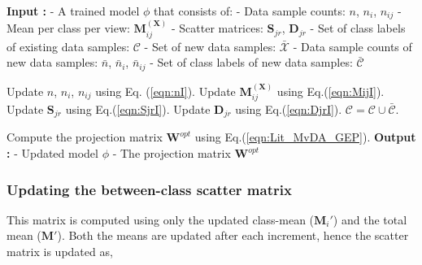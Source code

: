 \begin{algorithm}[t]
\caption{2DMvIDDA: Incremental algorithm}
    \begin{algorithmic}
	\STATE \textbf{Input :}
	\STATE - A trained model $\phi$ that consists of:
	\STATE 		\hspace{0.3cm} - Data sample counts: $n$, $n_i$, $n_{ij}$
	\STATE 		\hspace{0.3cm} - Mean per class per view: $\textbf{M}_{ij}^{(\textbf{X})}$
	\STATE 		\hspace{0.3cm} - Scatter matrices: $\textbf{S}_{jr}$, $\textbf{D}_{jr}$
	\STATE 		\hspace{0.3cm} - Set of class labels of existing data samples: $\mathcal{C}$
	\STATE 		- Set of new data samples: $\bar{\mathcal{X}}$
	\STATE 		- Data sample counts of new data samples: $\bar{n}$, $\bar{n}_{i}$, $\bar{n}_{ij}$
	\STATE 		- Set of class labels of new data samples: $\bar{\mathcal{C}}$ \vspace{0.1cm}

	
		\STATE \small Update $n$, $n_i$, $n_{ij}$ using Eq. (\ref{eqn:nI}).\;
		\STATE \small Update $\textbf{M}_{ij}^{(\textbf{X})}$ using Eq.(\ref{eqn:MijI}).\;
		\STATE \small Update $\textbf{S}_{jr}$ using Eq.(\ref{eqn:SjrI}).\;
		\STATE \small Update $\textbf{D}_{jr}$ using Eq.(\ref{eqn:DjrI}).\; \vspace{0.1cm}
		\STATE $\mathcal{C} = \mathcal{C} \cup \bar{\mathcal{C}}$.\;

		\STATE \small Compute the projection matrix $\textbf{W}^{opt}$ using Eq.(\ref{eqn:Lit_MvDA_GEP}).\;
	\ENDWHILE
	\STATE \textbf{Output :}
	\STATE - Updated model $\phi$
	\STATE - The projection matrix $\textbf{W}^{opt}$

\end{algorithmic}
\label{2DMvIDDA_Algo_Inc}
\end{algorithm}




\subsubsection{Updating the between-class scatter matrix}
\label{ssubs:2DMvIDDA_Inc_Sb}
This matrix is computed using only the updated class-mean ($\textbf{M}_{i}'$) and the total mean ($\textbf{M}'$). Both the means are updated after each increment, hence the scatter matrix is updated as,

